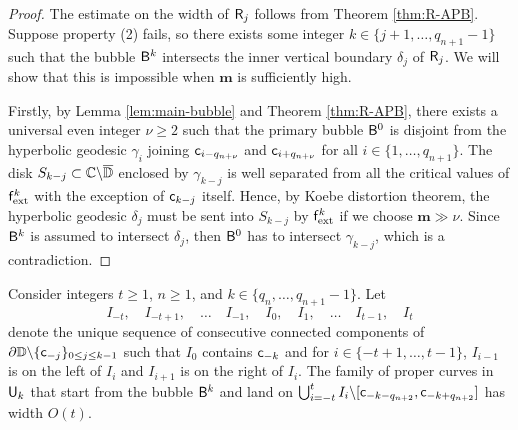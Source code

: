 \documentclass{amsart}
\begin{document}
\begin{proof}
    The estimate on the width of $\mathsf{R}_j$ follows from Theorem \ref{thm:R-APB}. 
    Suppose property (2) fails, so there exists some integer $k \in  \{ j+1,\ldots, q_{n+1}-1\}$ such that the bubble $\mathsf{B}^k$ intersects the inner vertical boundary $\delta_j$ of $\mathsf{R}_j$. 
    We will show that this is impossible when $\mathbf{m}$ is sufficiently high.

    Firstly, by Lemma \ref{lem:main-bubble} and Theorem \ref{thm:R-APB}, there exists a universal even integer $\nu \geq 2$ such that the primary bubble $\mathsf{B}^0$ is disjoint from the hyperbolic geodesic $\gamma_i$ joining $\mathsf{c}_{i-q_{n+\nu}}$ and $\mathsf{c}_{i+q_{n+\nu}}$ for all $i \in \{1,\ldots,q_{n+1}\}$. 
    The disk $S_{k-j} \subset \mathbb{C} \backslash \overline{\mathbb{D}}$ enclosed by $\gamma_{k-j}$ is well separated from all the critical values of $\mathsf{f}_{\textnormal{ext}}^{k}$ with the exception of $\mathsf{c}_{k-j}$ itself. 
    Hence, by Koebe distortion theorem, the hyperbolic geodesic $\delta_j$ must be sent into $S_{k-j}$ by $\mathsf{f}_{\textnormal{ext}}^{k}$ if we choose $\mathbf{m} \gg \nu$.
    Since $\mathsf{B}^k$ is assumed to intersect $\delta_j$, then $\mathsf{B}^0$ has to intersect $\gamma_{k-j}$, which is a contradiction.
\end{proof}

\begin{lemma}
\label{lem:local-width}
    Consider integers $t \geq 1$, $n \geq 1$, and $k \in \{ q_{n},\ldots,q_{n+1} -1 \}$. Let 
    \[
    I_{-t}, \quad I_{-t+1},\quad \ldots \quad I_{-1}, \quad I_0, \quad I_1, \quad \ldots \quad I_{t-1}, \quad I_t
    \]
    denote the unique sequence of consecutive connected components of $\partial \mathbb{D} \backslash \{ \mathsf{c}_{-j}\}_{0 \leq j \leq k-1}$ such that $I_0$ contains $\mathsf{c}_{-k}$ and for $i \in \{-t+1,\ldots,t-1\}$, $I_{i-1}$ is on the left of $I_i$ and $I_{i+1}$ is on the right of $I_i$. 
    The family of proper curves in $\mathsf{U}_k$ that start from the bubble $\mathsf{B}^k$ and land on $\bigcup_{i=-t}^t I_i \backslash [\mathsf{c}_{-k-q_{n+2}}, \mathsf{c}_{-k+q_{n+2}}]$ has width $O(t)$. 
\end{lemma}
\end{document}
